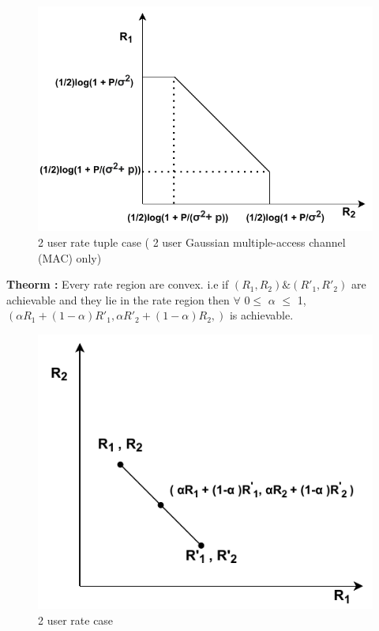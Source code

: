 \documentclass{article}
\begin{document}
  \begin{figure}[htb!]
  	\centering
  	\includegraphics[height=.25\textheight]{pic4.pdf}
  	\caption{2 user rate tuple  case ( 2 user Gaussian multiple-access channel (MAC) only)}
  \end{figure}
\newline 
\textbf{Theorm :} Every rate region are convex. i.e if   $\left( R_{1}, R_{2}\right) \& \left( R'_{1}, R'_{2}\right)$ are achievable and they lie in the rate region then $\forall$ 0$\leq$ $\alpha$ $\leq$ 1, \hspace{5pt} $\left( \alpha R_{1} + (1-\alpha)R'_{1}, \alpha R'_{2} + (1-\alpha)R_{2},   \right)$ is achievable.\\
  \begin{figure}[htb!]
	\centering
	\includegraphics[height=.25\textheight]{pic5.pdf}
	\caption{2 user rate  case}
\end{figure}
\end{document}
